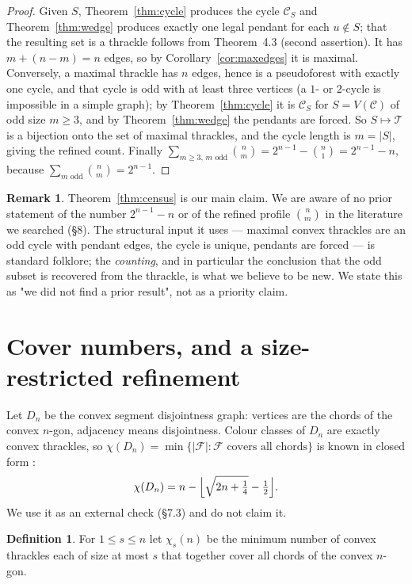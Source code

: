 \documentclass[11pt,a4paper]{article}
\theoremstyle{definition}
\newtheorem{definition}[theorem]{Definition}
\newtheorem{remark}[theorem]{Remark}
\theoremstyle{plain}
\newcommand{\Thr}{\mathcal{T}}
\newcommand{\mc}{\mathcal{C}}
\begin{document}
\begin{proof}
Given $S$, Theorem~\ref{thm:cycle} produces the cycle $\mc_S$ and
Theorem~\ref{thm:wedge} produces exactly one legal pendant for each
$u\notin S$; that the resulting set is a thrackle follows from Theorem~4.3
(second assertion).  It has $m+(n-m)=n$ edges, so by Corollary~\ref{cor:maxedges}
it is maximal.  Conversely, a maximal thrackle has $n$ edges, hence is a
pseudoforest with exactly one cycle, and that cycle is odd with at least three
vertices (a $1$- or $2$-cycle is impossible in a simple graph); by
Theorem~\ref{thm:cycle} it is $\mc_S$ for $S=V(\mc)$ of odd size $m\ge3$, and by
Theorem~\ref{thm:wedge} the pendants are forced.  So $S\mapsto\Thr$ is a
bijection onto the set of maximal thrackles, and the cycle length is $m=|S|$,
giving the refined count.  Finally
$\sum_{m\ge3,\,m\text{ odd}}\binom nm=2^{n-1}-\binom n1=2^{n-1}-n$,
because $\sum_{m\text{ odd}}\binom nm=2^{n-1}$.
\end{proof}

\begin{remark}\label{rem:novel}
Theorem~\ref{thm:census} is our main claim.  We are aware of no prior statement
of the number $2^{n-1}-n$ or of the refined profile $\binom nm$ in the
literature we searched (§8).  The structural input it uses --- maximal convex
thrackles are an odd cycle with pendant edges, the cycle is unique, pendants
are forced --- is standard folklore; the \emph{counting}, and in particular the
conclusion that the odd subset is recovered from the thrackle, is what we
believe to be new.  We state this as "we did not find a prior result", not as a
priority claim.
\end{remark}

\section{Cover numbers, and a size-restricted refinement}

Let $D_n$ be the convex segment disjointness graph: vertices are the chords of
the convex $n$-gon, adjacency means disjointness.  Colour classes of $D_n$ are
exactly convex thrackles, so
$\chi(D_n)=\min\{|\mathcal{F}|:\mathcal{F}\text{ covers all chords}\}$ is
known in closed form \cite{ADHNU,DW,FW}:
\[
\chi(D_n)=n-\Bigl\lfloor\sqrt{2n+\tfrac14}-\tfrac12\Bigr\rfloor .
\]
We use it as an external check (§7.3) and do not claim it.

\begin{definition}\label{def:chis}
For $1\le s\le n$ let $\chi_s(n)$ be the minimum number of convex thrackles
each of size at most $s$ that together cover all chords of the convex $n$-gon.
\end{definition}
\end{document}

